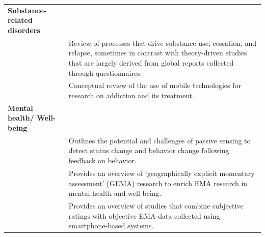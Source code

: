 \documentclass[]{book}
\begin{document}
\begin{longtable}[]{@{}ll@{}}
\begin{minipage}[t]{0.33\columnwidth}
\textbf{Substance-related disorders}\strut
\end{minipage} & \begin{minipage}[t]{0.61\columnwidth}\raggedright\strut
\strut
\end{minipage}\tabularnewline
\begin{minipage}[t]{0.33\columnwidth}\raggedright\strut
\citet{Shiffman2009}\strut
\end{minipage} & \begin{minipage}[t]{0.61\columnwidth}\raggedright\strut
Review of processes that drive substance use, cessation, and relapse,
sometimes in contrast with theory-driven studies that are largely
derived from global reports collected through questionnaires.\strut
\end{minipage}\tabularnewline
\begin{minipage}[t]{0.33\columnwidth}\raggedright\strut
\citet{Swendsen2016}\strut
\end{minipage} & \begin{minipage}[t]{0.61\columnwidth}\raggedright\strut
Conceptual review of the use of mobile technologies for research on
addiction and its treatment.\strut
\end{minipage}\tabularnewline
\begin{minipage}[t]{0.33\columnwidth}\raggedright\strut
\textbf{Mental health/ Well-being}\strut
\end{minipage} & \begin{minipage}[t]{0.61\columnwidth}\raggedright\strut
\strut
\end{minipage}\tabularnewline
\begin{minipage}[t]{0.33\columnwidth}\raggedright\strut
\citet{Cornet2017}\strut
\end{minipage} & \begin{minipage}[t]{0.61\columnwidth}\raggedright\strut
Outlines the potential and challenges of passive sensing to detect
status change and behavior change following feedback on behavior.\strut
\end{minipage}\tabularnewline
\begin{minipage}[t]{0.33\columnwidth}\raggedright\strut
\citet{kirchner2016}\strut
\end{minipage} & \begin{minipage}[t]{0.61\columnwidth}\raggedright\strut
Provides an overview of `geographically explicit momentary assessment'
(GEMA) research to enrich EMA research in mental health and
well-being.\strut
\end{minipage}\tabularnewline
\begin{minipage}[t]{0.33\columnwidth}\raggedright\strut
\citet{Dogan2017}\strut
\end{minipage} & \begin{minipage}[t]{0.61\columnwidth}\raggedright\strut
Provides an overview of studies that combine subjective ratings with
objective EMA-data collected using smartphone-based systems.\strut
\end{minipage}\tabularnewline
\bottomrule
\end{longtable}
\end{document}
